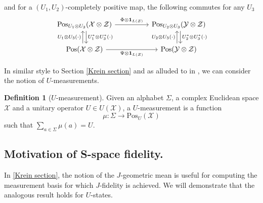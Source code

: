 \documentclass{amsart}
\numberwithin{equation}{section}
\theoremstyle{definition}
\newtheorem{definition}[theorem]{Definition}
\theoremstyle{plain}
\theoremstyle{solutionstyle}
\begin{document}
and for a $(U_1,U_2)$-completely positive map, the following commutes for any $U_3$
\begin{equation*}
\begin{tikzcd}[column sep=huge]
\mathrm{Pos}_{U_1\otimes U_3}(\mathcal{X}\otimes \mathcal{Z})
  \arrow[r, "\Phi\otimes \mathbf{1}_{L(\mathcal{Z})}"]
  \arrow[d, shift left=1, "U_1^*\otimes U_3^*(\cdot)"]
&
\mathrm{Pos}_{U_2\otimes U_3}(\mathcal{Y}\otimes \mathcal{Z})
  \arrow[d, shift left=1, "U_2^*\otimes U_3^*(\cdot)"] \\
\mathrm{Pos}(\mathcal{X}\otimes \mathcal{Z})
  \arrow[r, "\Psi\otimes \mathbf{1}_{L(\mathcal{Z})}"']
  \arrow[u, shift left=1, "U_1\otimes U_3(\cdot)"]
&
\mathrm{Pos}(\mathcal{Y}\otimes \mathcal{Z})
  \arrow[u, shift left=1, "U_2\otimes U_3(\cdot)"]
\end{tikzcd}
\end{equation*}

In similar style to Section \ref{Krein section} and as alluded to in \cite{bag2024quantumuchannelssspaces}, we can consider the notion of $U$-measurements. 

\begin{definition}[$U$-measurement]
    Given an alphabet $\Sigma$, a complex Euclidean space $\mathcal{X}$ and a unitary operator $U\in U(\mathcal{X})$, a $U$-measurement is a function
    \begin{equation*}\mu:\Sigma\to \mathrm{Pos}_U(\mathcal{X})\end{equation*} such that $\sum_{a\in\Sigma}\mu(a)=U$.
\end{definition}
\subsection{Motivation of S-space fidelity.}
In \ref{Krein section}, the notion of the $J$-geometric mean is useful for computing the measurement basis for which $J$-fidelity is achieved. We will demonstrate that the analogous result holds for $U$-states.
\end{document}
